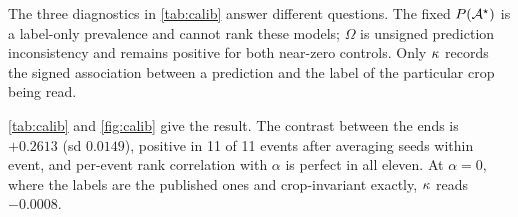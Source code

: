 \begin{table}[tb]
\centering
\scriptsize
\setlength{\tabcolsep}{1.3pt}
\caption{Crop-label alignment, model crop-dependence and accuracy against expert
labels, averaged descriptively over the eleven held-out events. Every $\kap$ uses the
same $\alpha=1$ reference set, with $P(\A^\star)=24.71\%$. \emph{Scramble} randomly
reassigns thresholds within each chip; \emph{offset} is constant within a chip and
varies only between chips.}
\label{tab:calib}
\end{table}

The three diagnostics in \cref{tab:calib} answer different questions. The fixed
$P(\mathcal{A}^\star)$ is a label-only prevalence and cannot rank these models; $\Omega$ is
unsigned prediction inconsistency and remains positive for both near-zero controls.
Only $\kap$ records the signed association between a prediction and the label of the
particular crop being read.

\cref{tab:calib} and \cref{fig:calib} give the result. The contrast between the ends
is $+0.2613$ (sd $0.0149$), positive in 11 of 11 events after averaging seeds within
event, and per-event rank
correlation with $\alpha$ is perfect in all eleven. At
$\alpha = 0$, where the labels are the published ones and crop-invariant exactly,
$\kap$ reads $-0.0008$.

